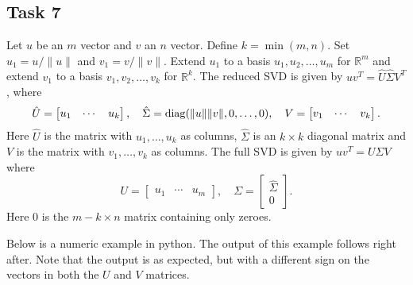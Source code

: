 \documentclass[a4paper,12pt]{article}
\begin{document}
\subsection*{Task 7}

Let \(u\) be an \(m\) vector and \(v\) an \(n\) vector.
Define \(k = \min(m,n)\).
Set \(u_1 = u/\|u\|\) and \(v_1 = v/\|v\|\).
Extend \(u_1\) to a basis \(u_1, u_2, \dots, u_m\) for \(\mathbb{R}^m\) and
extend \(v_1\) to a basis \(v_1, v_2, \dots, v_k\) for \(\mathbb{R}^k\).
The reduced SVD is given by \(uv^T = \hat{U} \hat{\Sigma} V^T\), where
\[
  \hat{U} =
    \begin{bmatrix}
      u_1 & \cdots & u_k
    \end{bmatrix}, \quad
  \hat{\Sigma} = \mathrm{diag}(\|u\|\|v\|, 0, \dots, 0),\quad
  V =
    \begin{bmatrix}
      v_1 & \cdots & v_k
    \end{bmatrix}.
\]
Here \(\hat{U}\) is the matrix with \(u_1,\dots,u_k\) as columns,
\(\hat{\Sigma}\) is an \(k \times k\) diagonal matrix and \(V\) is the matrix
with \(v_1,\dots,v_k\) as columns.
The full SVD is given by \(uv^T = U \Sigma V\) where
\[
  U =
    \begin{bmatrix}
      u_1 & \cdots & u_m
    \end{bmatrix},\quad
  \Sigma =
    \begin{bmatrix}
      \hat{\Sigma} \\
      0
    \end{bmatrix}.
\]
Here 0 is the \(m-k \times n\) matrix containing only zeroes.

Below is a numeric example in python.
The output of this example follows right after.
Note that the output is as expected, but with a different sign on the vectors in
both the \(U\) and \(V\) matrices.


\end{document}
